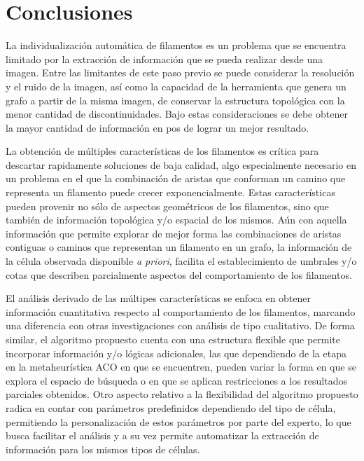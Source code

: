 \chapter{Conclusiones}
\label{chap:conclu}
La individualizaci\'on autom\'atica de filamentos es un problema que se encuentra limitado por la extracci\'on de informaci\'on que se pueda realizar desde una imagen. Entre las limitantes de este paso previo se puede considerar la resoluci\'on y el ruido de la imagen, as\'i como la capacidad de la herramienta que genera un grafo a partir de la misma imagen, de conservar la estructura topol\'ogica con la menor cantidad de discontinuidades. Bajo estas consideraciones se debe  obtener la mayor cantidad de informaci\'on en pos de lograr un mejor resultado.



La obtenci\'on de m\'ultiples caracter\'isticas de los filamentos es cr\'itica para descartar rapidamente soluciones de baja calidad, algo especialmente necesario en un problema en el que la combinaci\'on de aristas que conforman un camino que representa un filamento puede crecer exponencialmente. Estas caracter\'isticas pueden provenir no s\'olo de aspectos geom\'etricos de los filamentos, sino que tambi\'en de informaci\'on topol\'ogica y/o espacial de los mismos.
A\'un con aquella informaci\'on que permite explorar de mejor forma las combinaciones de aristas contiguas o caminos que representan un filamento en un grafo, la informaci\'on de la c\'elula observada disponible {\it a priori}, facilita el establecimiento de umbrales y/o cotas que describen parcialmente aspectos del comportamiento de los filamentos.

El an\'alisis derivado de las m\'ultipes caracter\'isticas se enfoca en obtener informaci\'on cuantitativa respecto al comportamiento de los filamentos, marcando una diferencia con otras investigaciones con an\'alisis de tipo cualitativo. De forma similar, el algoritmo propuesto cuenta con una estructura flexible que permite incorporar informaci\'on y/o l\'ogicas adicionales, las que dependiendo de la etapa en la metaheur\'istica ACO en que se encuentren, pueden variar la forma en que se explora el espacio de b\'usqueda o en que se aplican restricciones a los resultados parciales obtenidos. Otro aspecto relativo a la flexibilidad del algoritmo propuesto radica en contar con  par\'ametros predefinidos dependiendo del tipo de c\'elula, permitiendo la personalizaci\'on de estos par\'ametros por parte del experto, lo que busca facilitar el an\'alisis y a su vez permite automatizar la extracci\'on de informaci\'on para los mismos tipos de c\'elulas.


